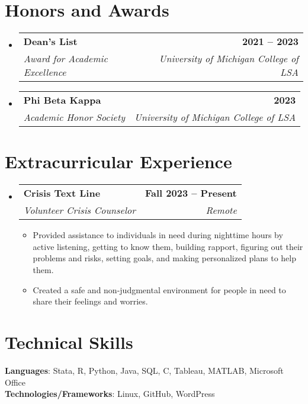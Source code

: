 \documentclass[letterpaper,11pt]{article}
\makeatletter
\newcommand{\resumeItem}[1]{
  \item\small{
    {#1 \vspace{-2pt}}
  }
}
\newcommand{\resumeSubheading}[4]{
  \vspace{-2pt}\item
    \begin{tabular*}{1.0\textwidth}[t]{l@{\extracolsep{\fill}}r}
      \textbf{#1} & \textbf{\small #2} \\
      \textit{\small#3} & \textit{\small #4} \\
    \end{tabular*}\vspace{-7pt}
}
\newcommand{\resumeSubHeadingListStart}{\begin{itemize}[leftmargin=0.0in, label={}]}
\newcommand{\resumeSubHeadingListEnd}{\end{itemize}}
\newcommand{\resumeItemListStart}{\begin{itemize}}
\newcommand{\resumeItemListEnd}{\end{itemize}\vspace{-5pt}}
\makeatother
\begin{document}
\section{Honors and Awards}
    \resumeSubHeadingListStart
        \resumeSubheading {Dean’s List}{2021 -- 2023}{Award for Academic Excellence}{University of Michigan College of LSA}
        \resumeSubheading {Phi Beta Kappa}{2023}{Academic Honor Society}{University of Michigan College of LSA}
    \resumeSubHeadingListEnd
 \vspace{-12pt}
 
\section{Extracurricular Experience}
    \resumeSubHeadingListStart
    \resumeSubheading{Crisis Text Line}{Fall 2023 -- Present}{Volunteer Crisis Counselor}{Remote}
            \resumeItemListStart
                \resumeItem{Provided assistance to individuals in need during nighttime hours by active listening, getting to know them, building rapport, figuring out their problems and risks, setting goals, and making personalized plans to help them.}
                \resumeItem{Created a safe and non-judgmental environment for people in need to share their feelings and worries.}
            \resumeItemListEnd
    \resumeSubHeadingListEnd
\vspace{-14pt}
 
\section{Technical Skills}
 \begin{itemize}[leftmargin=0.15in, label={}]
    \small{\item{
     \textbf{Languages}{: Stata, R, Python, Java, SQL, C, Tableau, MATLAB, Microsoft Office} \\
     \textbf{Technologies/Frameworks}{: Linux, GitHub, WordPress} \\
    }}
 \end{itemize}
 
\end{document}
